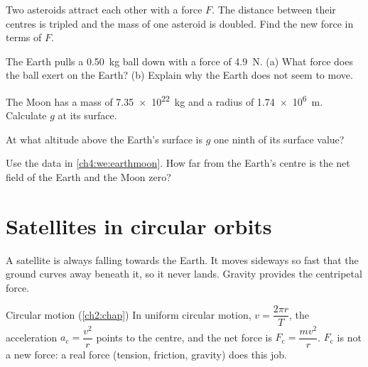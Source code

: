\begin{quickcheck}
  \item Two asteroids attract each other with a force $F$. The distance between their centres
        is tripled and the mass of one asteroid is doubled. Find the new force in terms of $F$.
  \item The Earth pulls a \qty{0.50}{kg} ball down with a force of \qty{4.9}{N}. (a) What force
        does the ball exert on the Earth? (b) Explain why the Earth does not seem to move.
  \item The Moon has a mass of \qty{7.35e22}{kg} and a radius of \qty{1.74e6}{m}. Calculate $g$
        at its surface.
  \item At what altitude above the Earth's surface is $g$ one ninth of its surface value?
  \item Use the data in \cref{ch4:we:earthmoon}. How far from the Earth's centre is the net field
        of the Earth and the Moon zero?
\end{quickcheck}

\section{Satellites in circular orbits}\label{ch4:sec:orbits}

\begin{bigidea}
A satellite is always falling towards the Earth. It moves sideways so fast that the ground
curves away beneath it, so it never lands. Gravity provides the centripetal force.
\end{bigidea}

\begin{keywords}
\end{keywords}

\begin{refresher}{Circular motion (\cref{ch2:chap})}
In uniform circular motion, $v = \dfrac{2\pi r}{T}$, the acceleration $a_\mathrm{c} = \dfrac{v^2}{r}$
points to the centre, and the net force is $F_\mathrm{c} = \dfrac{mv^2}{r}$. $F_\mathrm{c}$ is not a
new force: a real force (tension, friction, gravity) does this job.
\end{refresher}

